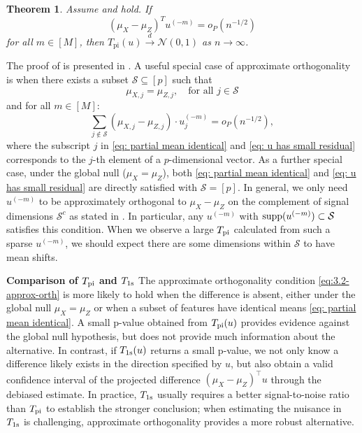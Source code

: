 \documentclass[11pt]{article}
\newtheorem{theorem}{Theorem}[section]
\begin{document}
\begin{theorem}\label{th: approximate orthogonal}
    Assume  and  hold. If 
    \begin{equation}
        \label{eq:3.2-approx-orth}
        (\mu_X-\mu_Z)^T u^{(-m)} = o_P(n^{-1/2})
    \end{equation}
    for all $m\in[M]$, then
     $T_{\mathrm{pi}}(u) \xrightarrow{d} \mathcal{N}(0,1)$ as $n \rightarrow \infty$.
\end{theorem}

The proof of  is presented in .
A useful special case of approximate orthogonality is when there exists a subset $\mathcal S\subseteq[p]$ such that
\begin{equation}\label{eq: partial mean identical}
        \mu_{X,j} = \mu_{Z,j},\quad\text{for all 
 }j\in \mathcal{S}
    \end{equation} and for all $m\in[M]$:
    \begin{equation}\label{eq: u has small residual}
        \sum_{j \notin \mathcal{S}}\left(\mu_{X,j}-\mu_{Z,j}\right) \cdot u^{(-m)}_j=o_P(n^{-1/2}),
    \end{equation}
where the subscript $j$ in \eqref{eq: partial mean identical} and \eqref{eq: u has small residual} corresponds to the $j$-th element of a $p$-dimensional vector.  As a further special case, under the global null ($\mu_X=\mu_Z$), both \eqref{eq: partial mean identical} and \eqref{eq: u has small residual} are directly satisfied with $\mathcal S=[p]$. In general, we only need $u^{(-m)}$ to be approximately orthogonal to $\mu_X - \mu_Z$ on the complement 
 of signal dimensions $\mathcal{S}^c$ as stated in . In particular, any $u^{(-m)}$ with ${\rm supp}(u^{(-m)}) \subset \mathcal{S}$ satisfies this condition. When we observe a large $T_{\rm pi}$ calculated from such a sparse $u^{(-m)}$, we should expect there are some dimensions within $\mathcal{S}$ to have mean shifts.

\textbf{Comparison of $T_{\rm pi}$ and $T_{\rm 1s}$}
The approximate orthogonality condition \eqref{eq:3.2-approx-orth} is more likely to hold when the difference is absent, either under the global null $\mu_X=\mu_Z$ or when a subset of features have identical means \eqref{eq: partial mean identical}. A small p-value obtained from $T_{\rm pi}(u)$ provides evidence against the global null hypothesis, but does not provide much information about the alternative. In contrast, if $T_{\rm 1s}(u)$ returns a small p-value, we not only know a difference likely exists in the direction specified by $u$, but also obtain a valid confidence interval of the projected difference $(\mu_X - \mu_Z)^\top u$ through the debiased estimate. In practice, $T_{\rm 1s}$ usually requires a better signal-to-noise ratio than $T_{\rm pi}$ to establish the stronger conclusion; when estimating the nuisance in $T_{\rm 1s}$ is challenging, approximate orthogonality provides a more robust alternative. 
\end{document}
